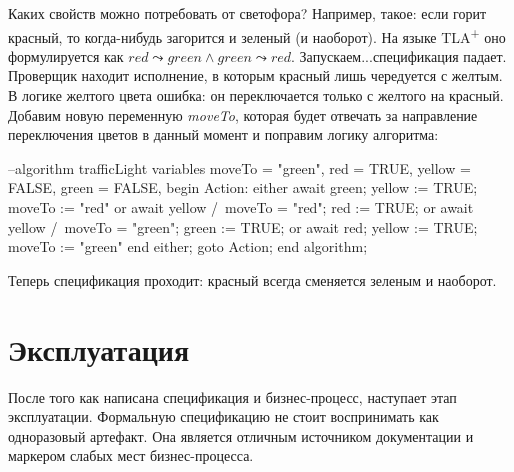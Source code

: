 \documentclass[14pt, openany]{report}
\newcommand{\tlapl}{TLA\textsuperscript{+} }
\begin{document}
Каких свойств можно потребовать от светофора? Например, такое: если горит красный, то когда-нибудь загорится и зеленый (и наоборот). На языке \tlapl оно формулируется как \(red \leadsto green \land green \leadsto red \). Запускаем...спецификация падает. Проверщик находит исполнение, в которым красный лишь чередуется с желтым. В логике желтого цвета ошибка: он переключается только с желтого на красный. Добавим новую переменную \emph{moveTo}, которая будет отвечать за направление переключения цветов в данный момент и поправим логику алгоритма:

\begin{ppcal}
  --algorithm trafficLight
  variables
    moveTo = "green",
    red = TRUE,
    yellow = FALSE,
    green = FALSE,
  begin
    Action:
      either
        await green;
        yellow := TRUE;
        moveTo := "red"
      or 
        await yellow /\ moveTo = "red";
        red := TRUE;
      or 
        await yellow /\ moveTo = "green";
        green := TRUE;
      or 
        await red;
        yellow := TRUE;
        moveTo := "green"
      end either;
    goto Action;
  end algorithm;
\end{ppcal}
\begin{tlatex}
%
%
%
%
%
%
%
%
%
%
%
%
%
%
%
%
%
%
%
%
%
%
%
\end{tlatex}

Теперь спецификация проходит: красный всегда сменяется зеленым и наоборот.

\section{Эксплуатация}
После того как написана спецификация и бизнес-процесс, наступает этап эксплуатации.
Формальную спецификацию не стоит воспринимать как одноразовый артефакт. Она является отличным источником документации и маркером слабых мест бизнес-процесса. 
\end{document}
